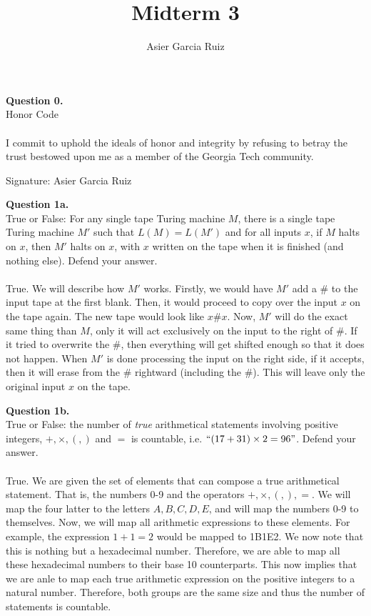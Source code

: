 \documentclass{article}
\title{Midterm 3}
\author{Asier Garcia Ruiz}
\newenvironment{question}[2]
{
    {\large \textbf{Question #1.}}\\
    #2\\\\
}{\newpage}
\begin{document}
\maketitle

\begin{question}
    {0}{Honor Code}
    I commit to uphold the ideals of honor and integrity by refusing to betray the
    trust bestowed upon me as a member of the Georgia Tech community.

    Signature: Asier Garcia Ruiz
\end{question}

\begin{question}
    {1a}
    {True or False: For any single tape Turing machine $M$, there is a
        single tape Turing machine $M'$ such that $L(M) = L(M')$ and for all inputs $x$, if
        $M$ halts on $x$, then $M'$ halts on $x$, with $x$ written on the tape when it is
        finished (and nothing else). Defend your answer.}

    True. We will describe how $M'$ works. Firstly, we would have $M'$ add a \# to the input tape at the first blank. Then, it would proceed to copy
    over the input $x$ on the tape again. The new tape would look like $x\# x$. Now, $M'$ will do the exact same thing than $M$, only it will act exclusively
    on the input to the right of \#. If it tried to overwrite the \#, then everything will get shifted enough so that it
    does not happen. When $M'$ is done processing the input on the right side, if it accepts, then it will erase from the \# rightward (including the \#).
    This will leave only the original input $x$ on the tape.
\end{question}

\begin{question}
    {1b}
    {True or False: the number of \emph{true} arithmetical statements
        involving positive integers, $+, \times, (, )$ and $=$ is countable, i.e. $``(17+31)\times2=96"$. Defend your answer.}

    True. We are given the set of elements that can compose a true arithmetical statement. That is, the numbers 0-9 and the operators
    $+, \times, (, ), =$. We will map the four latter to the letters $A, B, C, D, E$, and will map the numbers 0-9 to themselves.
    Now, we will map all arithmetic expressions to these elements. For example, the expression $1 + 1 = 2$ would be mapped to 1B1E2.
    We now note that this is nothing but a hexadecimal number. Therefore, we are able to map all these hexadecimal numbers to their base 10
    counterparts. This now implies that we are anle to map each true arithmetic expression on the positive integers to a natural number.
    Therefore, both groups are the same size and thus the number of statements is countable.
\end{question}
\end{document}
